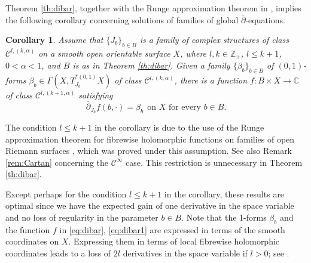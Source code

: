 \documentclass[11pt]{amsart}
\numberwithin{equation}{section}
\newtheorem{corollary}[theorem]{Corollary}
\theoremstyle{definition}
\newcommand\Cscr{\mathscr{C}}
\newcommand\C{\mathbb{C}}
\newcommand\Z{\mathbb{Z}}
\newcommand\dibar{\overline\partial}
\begin{document}
Theorem \ref{th:dibar}, together with the Runge approximation theorem in
\cite[Theorem 1.1]{Forstneric2024Runge}, implies the following corollary
concerning solutions of families of global $\dibar$-equations.

%
%
\begin{corollary}\label{cor:dibar}
Assume that $\{J_b\}_{b\in B}$ is a family of complex structures 
of class $\Cscr^{l,(k,\alpha)}$ on a smooth open orientable surface $X$,
where $l,k\in \Z_+$, $l\le k+1$, $0<\alpha<1$,  
and $B$ is as in Theorem \ref{th:dibar}. 
Given a family $\{\beta_b\}_{b\in B}$ of $(0,1)$-forms 
$\beta_b\in \Gamma(X,T^{*(0,1)}_{J_b}X)$ of class 
$\Cscr^{l,(k,\alpha)}$, there is a function $f:B\times X\to\C$
of class $\Cscr^{l,(k+1,\alpha)}$ satisfying
\begin{equation}\label{eq:dibar1}
	\dibar_{J_b} f(b,\cdotp) = \beta_b \ \ 
	\text{on $X$ for every $b\in B$.}
\end{equation}
\end{corollary}

The condition $l\le k+1$ in the corollary is due to the use of the Runge
approximation theorem for fibrewise holomorphic functions
on families of open Riemann surfaces 
\cite[Theorem 1.1]{Forstneric2024Runge}, which 
was proved under this assumption. 
See also Remark \ref{rem:Cartan} concerning the $\Cscr^\infty$ case. 
This restriction is unnecessary in Theorem \ref{th:dibar}.

Except perhaps for the condition $l\le k+1$ in the corollary,
these results are optimal since we have the expected gain of one derivative 
in the space variable and no loss of regularity
in the parameter $b\in B$. Note that the 1-forms 
$\beta_b$ and the function $f$ in \eqref{eq:dibar}, \eqref{eq:dibar1}
are expressed in terms of the smooth coordinates on $X$. Expressing
them in terms of local fibrewise holomorphic coordinates leads 
to a loss of $2l$ derivatives in the space variable if $l>0$; 
see \cite[V3, Theorem 9.1]{Forstneric2024Runge}.
\end{document}

